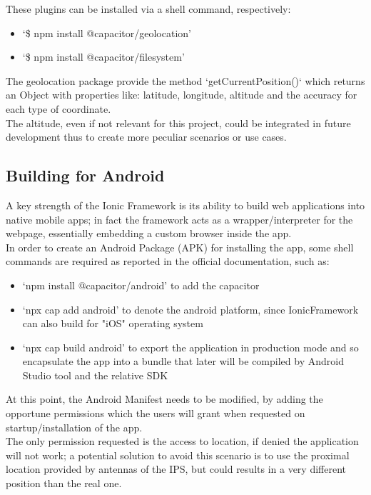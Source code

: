 \documentclass[conference]{IEEEtran}
\begin{document}
These plugins can be installed via a shell command, respectively:
\begin{itemize}
    \item `\$ npm install @capacitor/geolocation'
    \item `\$ npm install @capacitor/filesystem'
\end{itemize}

The geolocation package provide the method `getCurrentPosition()` which returns an Object with properties like: latitude, longitude, altitude and the accuracy for each type of coordinate. 
\\
The altitude, even if not relevant for this project, could be integrated in future development thus to create more peculiar scenarios or use cases.


\subsection{Building for Android}

A key strength of the Ionic Framework is its ability to build web applications into native mobile apps; in fact the framework acts as a wrapper/interpreter for the webpage, essentially embedding a custom browser inside the app.
\\
In order to create an Android Package (APK) for installing the app, some shell commands are required as reported in the official documentation, such as:
\begin{itemize}
    \item `npm install @capacitor/android' to add the capacitor
    \item  `npx cap add android' to denote the android platform, since IonicFramework can also build for "iOS" operating system
    \item `npx cap build android' to export the application in production mode and so encapsulate the app into a bundle that later will be compiled by Android Studio\cite{b11} tool and the relative SDK 
\end{itemize}


At this point, the Android Manifest needs to be modified, by adding the opportune permissions which the users will grant when requested on startup/installation of the app.
\\
The only permission requested is the access to location, if denied the application will not work; a potential solution to avoid this scenario is to use the proximal location provided by antennas of the IPS, but could results in a very different position than the real one.
\end{document}
